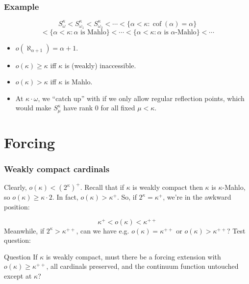 \documentclass{beamer}
\newcommand{\cof}{\operatorname{cof}}
\begin{document}
\begin{frame}
\frametitle{Example}
$$S_\omega^\kappa < S_{\omega_1}^\kappa < S_{\omega_2}^\kappa < \cdots < \{\alpha < \kappa: \cof(\alpha) = \alpha\}$$
$$< \{\alpha < \kappa: \alpha \text{ is Mahlo}\} < \cdots < \{\alpha < \kappa: \alpha \text{ is } \alpha \text{-Mahlo}\} < \cdots$$
\begin{itemize}
\item $o(\aleph_{\alpha+1}) = \alpha + 1$. \pause
\item $o(\kappa) \geq \kappa$ iff $\kappa$ is (weakly) inaccessible.
\item $o(\kappa) > \kappa$ iff $\kappa$ is Mahlo. \pause
\item At $\kappa \cdot \omega$, we ``catch up'' with if we only allow regular reflection points, which would make $S_\mu^\kappa$ have rank 0 for all fixed $\mu < \kappa$.
\end{itemize}
\end{frame}

\section{Forcing}

\begin{frame}
\frametitle{Weakly compact cardinals}
Clearly, $o(\kappa) < (2^\kappa)^+$. Recall that if $\kappa$ is weakly compact then $\kappa$ is $\kappa$-Mahlo, so $o(\kappa) \geq \kappa \cdot 2$. In fact, $o(\kappa) > \kappa^+$. So, if $2^\kappa = \kappa^+$, we're in the awkward position:

$$\kappa^+ < o(\kappa) < \kappa^{++}$$
\pause
Meanwhile, if $2^\kappa > \kappa^{++}$, can we have e.g. $o(\kappa) = \kappa^{++}$ or $o(\kappa) > \kappa^{++}$? Test question:

\begin{block}{Question}
If $\kappa$ is weakly compact, must there be a forcing extension with $o(\kappa) \geq \kappa^{++}$, all cardinals preserved, and the continuum function untouched except at $\kappa$?
\end{block}
\end{frame}
\end{document}

